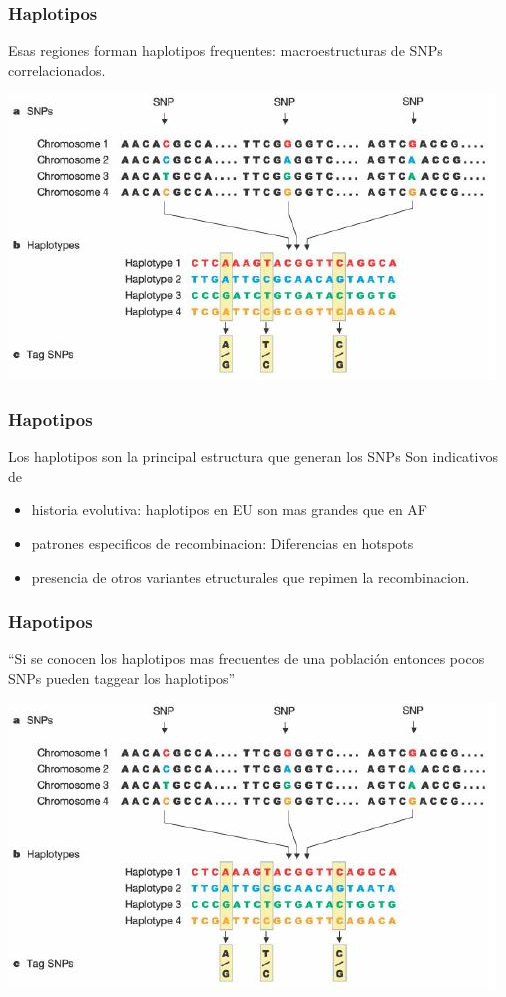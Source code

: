 \documentclass{beamer}\usepackage[]{graphicx}\usepackage[]{color}
\begin{document}
\begin{frame}[fragile] 
\frametitle{Haplotipos}

Esas regiones forman haplotipos frequentes: 
macroestructuras de SNPs correlacionados.

\includegraphics[width=0.8\linewidth]{haplo.jpg}

\end{frame}


\begin{frame}[fragile] 
\frametitle{Hapotipos}

Los haplotipos son la principal estructura que generan los SNPs
Son indicativos de
\begin{itemize}
\item historia evolutiva: haplotipos en EU son mas grandes que en AF
\item patrones especificos de recombinacion: Diferencias en hotspots
\item presencia de otros variantes etructurales que repimen la recombinacion.
\end{itemize}

\end{frame}


\begin{frame}[fragile] 
\frametitle{Hapotipos}

``Si se conocen los haplotipos mas frecuentes de una poblaci\'on
entonces pocos SNPs pueden taggear los haplotipos''

\includegraphics[width=0.8\linewidth]{haplo.jpg}

\end{frame}
\end{document}
